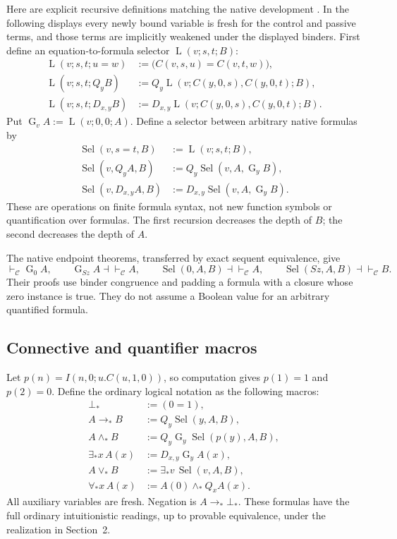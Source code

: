 \documentclass[11pt]{article}
\theoremstyle{definition}\newtheorem{definition}[theorem]{Definition}
\theoremstyle{remark}\newtheorem{remark}[theorem]{Remark}
\newcommand{\C}{\mathcal C}
\newcommand{\Sel}{\operatorname{Sel}}
\newcommand{\Gate}{\operatorname{G}}
\newcommand{\Lsel}{\operatorname{L}}
\begin{document}
Here are explicit recursive definitions matching the native development
\cite{gate}. In the following displays every newly bound variable is
fresh for the control and passive terms, and those terms are implicitly
weakened under the displayed binders. First define an equation-to-formula
selector $\Lsel(v;s,t;B)$:
\begin{align*}
 \Lsel(v;s,t;u=w)&:=
      \bigl(C(v,s,u)=C(v,t,w)\bigr),\\
 \Lsel(v;s,t;Q_yB)&:=
      Q_y\Lsel(v;C(y,0,s),C(y,0,t);B),\\
 \Lsel(v;s,t;D_{x,y}B)&:=
      D_{x,y}\Lsel(v;C(y,0,s),C(y,0,t);B).
\end{align*}
Put $\Gate_vA:=\Lsel(v;0,0;A)$. Define a selector between arbitrary
native formulas by
\begin{align*}
 \Sel(v,s=t,B)&:=\Lsel(v;s,t;B),\\
 \Sel(v,Q_yA,B)&:=Q_y\Sel(v,A,\Gate_yB),\\
 \Sel(v,D_{x,y}A,B)&:=D_{x,y}\Sel(v,A,\Gate_yB).
\end{align*}
These are operations on finite formula syntax, not new function symbols
or quantification over formulas. The first recursion decreases the
depth of $B$; the second decreases the depth of $A$.

The native endpoint theorems, transferred by exact sequent equivalence,
give
\[
 \vdash_{\C}\Gate_0A,\qquad
 \Gate_{Sz}A\dashv\vdash_{\C}A,\qquad
 \Sel(0,A,B)\dashv\vdash_{\C}A,\qquad
 \Sel(Sz,A,B)\dashv\vdash_{\C}B.
\]
Their proofs use binder congruence and padding a formula with a closure
whose zero instance is true. They do not assume a Boolean value for an
arbitrary quantified formula.

\subsection{Connective and quantifier macros}

Let $p(n)=I(n,0;u.C(u,1,0))$, so computation gives $p(1)=1$ and
$p(2)=0$. Define the ordinary logical notation as the following macros:
\begin{align*}
 \bot_*&:=(0=1),\\
 A\to_*B&:=Q_y\Sel(y,A,B),\\
 A\wedge_*B&:=Q_y\Gate_y\Sel(p(y),A,B),\\
 \exists_*x\,A(x)&:=D_{x,y}\Gate_yA(x),\\
 A\vee_*B&:=\exists_*v\,\Sel(v,A,B),\\
 \forall_*x\,A(x)&:=A(0)\wedge_*Q_xA(x).
\end{align*}
All auxiliary variables are fresh. Negation is $A\to_*\bot_*$.
These formulas have the full ordinary intuitionistic readings, up to
provable equivalence, under the realization in Section~2.
\end{document}

